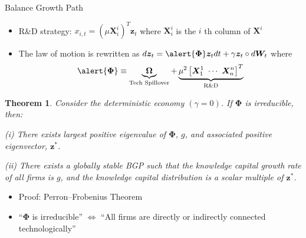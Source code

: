 \documentclass[
  10pt,               %
  aspectratio=169,    %
  handout             %
]{beamer}
\theoremstyle{plain}
\newtheorem*{thm*}{Theorem}
\begin{document}
\begin{frame}{Balance Growth Path}
  \begin{itemize}
    \item R\&D strategy: $x_{i,t}=\left(\mu \bm{X}_{i}^{i}\right)^{T}\bm{z}_{t}$
          where $\bm{X}_{i}^{i}$ is the $i$ th column of $\bm{X}^{i}$
    \item The law of motion is rewritten as $d\bm{z}_{t}=\alert{\bm{\Phi}}\bm{z}_{t}dt+\gamma\bm{z}_{t} \circ d\bm{W}_{t}$
          where
          \[
            \alert{\bm{\Phi}}\equiv\underbrace{\bm{\Omega}}_{\text{Tech Spillover}}+\underbrace{\mu^{2}\left[
              \bm{X}_{1}^{1} \ \cdots \ \bm{X}_{n}^{n}\right]^{T}}_{\text{R\&D}}
          \]
          \vspace{-5mm}
  \end{itemize}
  \begin{thm*}
    Consider the deterministic economy $(\gamma=0)$. If \alert{$\bm{\Phi}$} is irreducible, then:

    (i) There exists largest positive eigenvalue of \alert{$\bm{\Phi}$}, $g$, and
    associated positive eigenvector, $\bm{z}^{*}$.

    (ii) There exists a globally stable BGP such that the knowledge capital
    growth rate of all firms is $g$, and the knowledge capital distribution
    is a scalar multiple of $\bm{z}^{*}$.
  \end{thm*}
  \begin{itemize}
    \item Proof: Perron--Frobenius Theorem
    \item ``\alert{$\bm{\Phi}$} is irreducible'' $\Longleftrightarrow$ ``All firms are
          directly or indirectly connected technologically''
  \end{itemize}
\end{frame}
\end{document}
